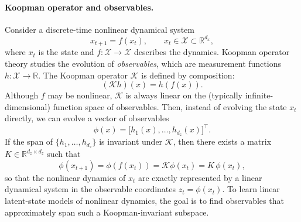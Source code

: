\paragraph{Koopman operator and observables.}
Consider a discrete-time nonlinear dynamical system
\begin{equation}
x_{t+1} = f(x_t), \qquad x_t \in \mathcal{X} \subset \mathbb{R}^{d_x},
\end{equation}
where $x_t$ is the state and $f : \mathcal{X} \to \mathcal{X}$ describes the dynamics.
Koopman operator theory studies the evolution of \emph{observables}, which are measurement functions $h : \mathcal{X} \to \mathbb{R}$.
The Koopman operator $\mathcal{K}$ is defined by composition:
\begin{equation}
(\mathcal{K}h)(x) = h(f(x)).
\end{equation}
Although $f$ may be nonlinear, $\mathcal{K}$ is always linear on the (typically infinite-dimensional) function space of observables. Then, instead of evolving the state $x_t$ directly, we can evolve a vector of observables
\begin{equation}
\phi(x) = \big[h_1(x), \dots, h_{d_z}(x)\big]^\top.
\end{equation}
If the span of $\{h_1,\dots,h_{d_z}\}$ is invariant under $\mathcal{K}$, 
then there exists a matrix
$K \in \mathbb{R}^{d_z \times d_z}$ such that
\begin{equation}
\phi(x_{t+1}) = \phi(f(x_t)) = \mathcal{K}\phi(x_t) = K\, \phi(x_t),
\end{equation}
so that the nonlinear dynamics of $x_t$ are exactly represented by a linear dynamical system
in the observable coordinates $z_t = \phi(x_t)$.
To learn linear latent-state models of nonlinear dynamics, the goal is to find observables that approximately span such a Koopman-invariant subspace.

